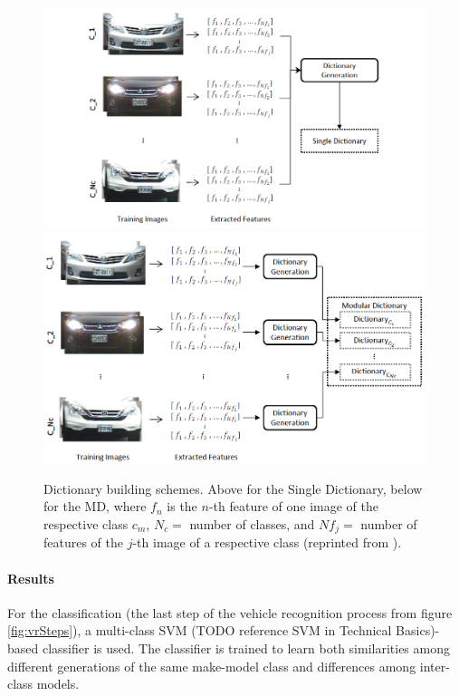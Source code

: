 \begin{figure}[bth]
  \centering
        \includegraphics[width=.95\linewidth]{gfx/single_dictionary_reprint}
        \includegraphics[width=.95\linewidth]{gfx/modular_dictionary_reprint}
        \caption{Dictionary building schemes. Above for the Single Dictionary, below for the MD, where $f_n$ is the $n$-th feature of one image of the respective class $c_m$, $N_c = $ number of classes, and $Nf_j = $ number of features of the $j$-th image of a respective class (reprinted from \citep{siddiqui2015robust}).}
        \label{fig:dictionarySDMD}
\end{figure}

\paragraph{Results}
For the classification (the last step of the vehicle recognition process from figure \ref{fig:vrSteps}), a multi-class SVM (TODO reference SVM in Technical Basics)-based classifier is used. The classifier is trained to learn both similarities among different generations of the same make-model class and differences among inter-class models.


